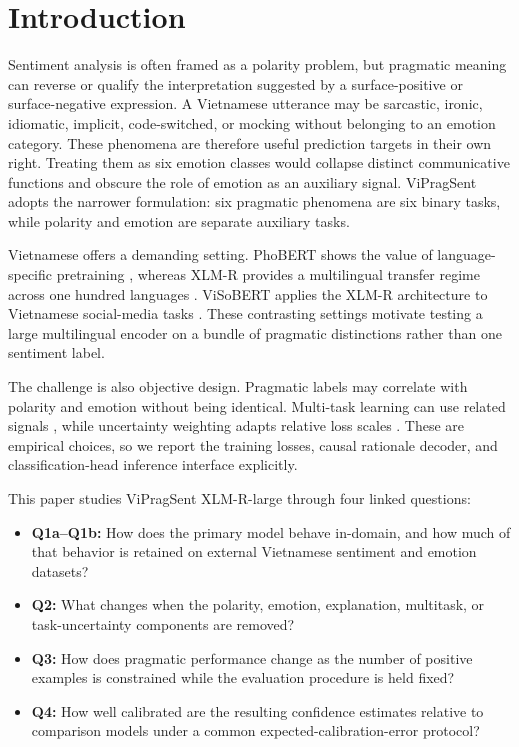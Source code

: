 \section{Introduction}

Sentiment analysis is often framed as a polarity problem, but pragmatic meaning can reverse or qualify the interpretation suggested by a surface-positive or surface-negative expression. A Vietnamese utterance may be sarcastic, ironic, idiomatic, implicit, code-switched, or mocking without belonging to an emotion category. These phenomena are therefore useful prediction targets in their own right. Treating them as six emotion classes would collapse distinct communicative functions and obscure the role of emotion as an auxiliary signal. ViPragSent adopts the narrower formulation: six pragmatic phenomena are six binary tasks, while polarity and emotion are separate auxiliary tasks.

Vietnamese offers a demanding setting. PhoBERT shows the value of language-specific pretraining \citep{nguyen-tuan-nguyen-2020-phobert}, whereas XLM-R provides a multilingual transfer regime across one hundred languages \citep{conneau-etal-2020-unsupervised}. ViSoBERT applies the XLM-R architecture to Vietnamese social-media tasks \citep{nguyen-etal-2023-visobert}. These contrasting settings motivate testing a large multilingual encoder on a bundle of pragmatic distinctions rather than one sentiment label.

The challenge is also objective design. Pragmatic labels may correlate with polarity and emotion without being identical. Multi-task learning can use related signals \citep{caruana1997multitask}, while uncertainty weighting adapts relative loss scales \citep{kendall2018multitask}. These are empirical choices, so we report the training losses, causal rationale decoder, and classification-head inference interface explicitly.

This paper studies ViPragSent XLM-R-large through four linked questions:

\begin{itemize}
\item \textbf{Q1a--Q1b:} How does the primary model behave in-domain, and how much of that behavior is retained on external Vietnamese sentiment and emotion datasets?
\item \textbf{Q2:} What changes when the polarity, emotion, explanation, multitask, or task-uncertainty components are removed?
\item \textbf{Q3:} How does pragmatic performance change as the number of positive examples is constrained while the evaluation procedure is held fixed?
\item \textbf{Q4:} How well calibrated are the resulting confidence estimates relative to comparison models under a common expected-calibration-error protocol?
\end{itemize}

